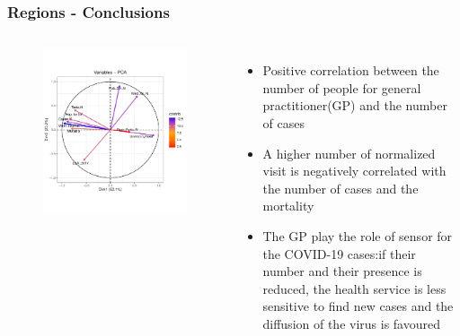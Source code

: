 \documentclass[compress]{beamer}
\begin{document}
\begin{frame}
\frametitle{Regions - Conclusions}
\begin{columns}
\begin{figure}[H]
\centering
\begin{minipage}{\textwidth}
  \centering
  \includegraphics[width=\linewidth, ]{Pic/Regioni_PCA_loadings.pdf}
\end{minipage}%
\end{figure}
\begin{itemize}
\item Positive correlation between the number of people for general practitioner(GP) and the number of cases
\item A higher number of normalized visit is negatively correlated with the number of cases and the mortality
\item The GP play the role of sensor for the COVID-19 cases:if their number and their presence is reduced, the health service is less sensitive to find new cases and the diffusion of the virus is favoured \cite{24plus}

\end{itemize}
\end{columns}
\end{frame}
\end{document}
